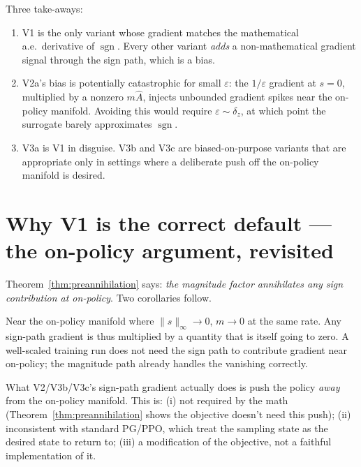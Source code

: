 \documentclass[11pt]{article}
\DeclareMathOperator{\sign}{sgn}
\begin{document}
Three take-aways:

\begin{enumerate}
\item V1 is the only variant whose gradient matches the mathematical
a.e.\ derivative of $\sign$. Every other variant \emph{adds} a
non-mathematical gradient signal through the sign path, which is a bias.
\item V2a's bias is potentially catastrophic for small $\varepsilon$:
the $1/\varepsilon$ gradient at $s=0$, multiplied by a nonzero
$m\hat A$, injects unbounded gradient spikes near the on-policy
manifold. Avoiding this would require $\varepsilon \sim \delta_z$, at
which point the surrogate barely approximates $\sign$.
\item V3a is V1 in disguise. V3b and V3c are biased-on-purpose variants
that are appropriate only in settings where a deliberate push off the
on-policy manifold is desired.
\end{enumerate}

\section{Why V1 is the correct default --- the on-policy argument, revisited}
\label{sec:whyV1}

Theorem~\ref{thm:preannihilation} says: \emph{the magnitude factor
annihilates any sign contribution at on-policy}. Two corollaries follow.

\begin{corollary}
Near the on-policy manifold where $\|s\|_\infty \to 0$,
$m \to 0$ at the same rate. Any sign-path gradient is thus
multiplied by a quantity that is itself going to zero. A well-scaled
training run does not need the sign path to contribute gradient near
on-policy; the magnitude path already handles the vanishing correctly.
\end{corollary}

\begin{corollary}
What V2/V3b/V3c's sign-path gradient actually does is push the policy
\emph{away} from the on-policy manifold. This is:
(i) not required by the math (Theorem~\ref{thm:preannihilation} shows the
objective doesn't need this push);
(ii) inconsistent with standard PG/PPO, which treat the sampling state
as the desired state to return to;
(iii) a modification of the objective, not a faithful implementation of it.
\end{corollary}
\end{document}
